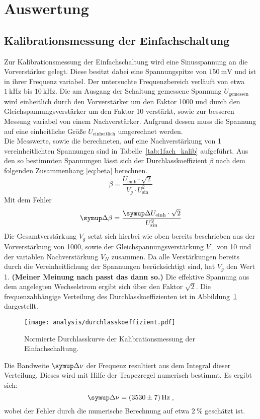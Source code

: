 \section{Auswertung}
\label{sec:auswertung}
%

%
\subsection{Kalibrationsmessung der Einfachschaltung}
%
Zur Kalibrationsmessung der Einfachschaltung wird eine Sinusspannung an die
Vorverstärker gelegt. Diese besitzt dabei eine Spannungspitze von
$\SI{150}{\milli\volt}$ und ist in ihrer Frequenz variabel. Der untersuchte
Frequenzbereich verläuft von etwa $\SI{1}{\kilo\hertz}$ bis
$\SI{10}{\kilo\hertz}$. Die am Ausgang der Schaltung gemessene Spannung
$U_\text{gemessen}$ wird einheitlich durch den Vorverstärker um den Faktor
\num{1000} und durch den Gleichspannungsverstärker um den Faktor \num{10}
verstärkt, sowie zur besseren Messung variabel von einem Nachverstärker.
Aufgrund dessen muss die Spannung auf eine einheitliche Größe $U_\text{einheitlich}$
umgerechnet werden.\\
%
Die Messwerte, sowie die berechneten, auf eine Nachverstärkung von \num{1}
vereinheitlichten Spannungen sind in Tabelle~\ref{tab:1fach_kalib} aufgeführt.
Aus den so bestimmten Spannungen lässt sich der Durchlasskoeffizient $\beta$
nach dem folgenden Zusammenhang \eqref{eq:beta} berechnen.
%
\begin{equation}
  \beta= \frac{U_\text{einh} \cdot \sqrt{2}}{V_g \cdot U_\text{sin}^2}
  \label{eq:beta}
\end{equation}
%
Mit dem Fehler
%
\begin{equation}
  \upD\beta=\frac{\upD U_\text{einh}\cdot\sqrt{2}}{U^2_\text{sin}}
\end{equation}
%
Die Gesamtverstärkung $V_g$ setzt sich hierbei wie oben bereits beschrieben aus
der Vorverstärkung von \num{1000}, sowie der Gleichspannungsverstärkung $V_{=}$ von
\num{10} und der variablen Nachverstärkung $V_N$ zusammen. Da alle Verstärkungen bereits
durch die Vereinheitlichung der Spannungen berücksichtigt sind, hat $V_g$ den Wert
\num{1}. \textbf{(Meiner Meinung nach passt das dann so.)} Die effektive Spannung aus dem angelegten Wechselstrom ergibt sich über den Faktor $\sqrt{2}$.
Die frequenzabhängige Verteilung des Durchlasskoeffizienten ist in
Abbildung~\ref{fig:beta} dargestellt.
%
\begin{figure}
  \centering
  \texttt{[image: analysis/durchlasskoeffizient.pdf]}
  \caption{Normierte Durchlasskurve der Kalibrationsmessung der Einfachschaltung.}
  \label{fig:beta}
\end{figure}
%
Die Bandweite $\upD\nu$ der Frequenz resultiert aus dem Integral dieser
Verteilung. Dieses wird mit Hilfe der Trapezregel numerisch bestimmt. Es ergibt
sich:
%
\begin{equation}
  \upD\nu=\SI{3530(7)}{\hertz}\; ,
\end{equation}
%
wobei der Fehler durch die numerische Berechnung auf etwa $\SI{2}{\percent}$ geschätzt ist.
